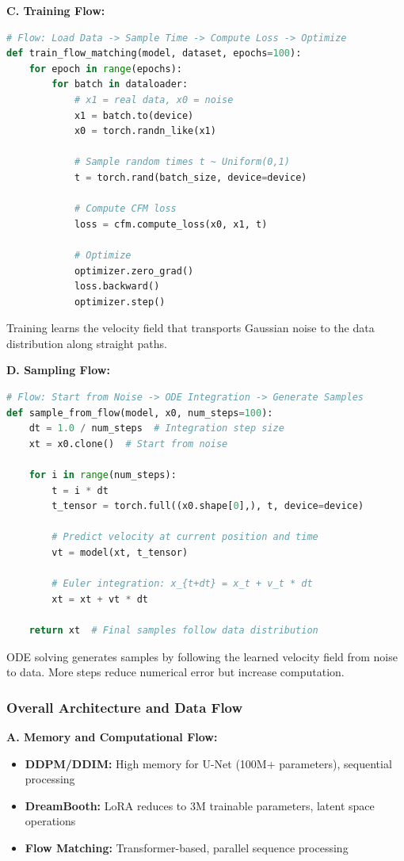 \documentclass[a4paper,12pt]{article}
\begin{document}
\textbf{C. Training Flow:}
\begin{lstlisting}[language=Python]
# Flow: Load Data -> Sample Time -> Compute Loss -> Optimize
def train_flow_matching(model, dataset, epochs=100):
    for epoch in range(epochs):
        for batch in dataloader:
            # x1 = real data, x0 = noise
            x1 = batch.to(device)
            x0 = torch.randn_like(x1)
            
            # Sample random times t ~ Uniform(0,1)
            t = torch.rand(batch_size, device=device)
            
            # Compute CFM loss
            loss = cfm.compute_loss(x0, x1, t)
            
            # Optimize
            optimizer.zero_grad()
            loss.backward()
            optimizer.step()
\end{lstlisting}
Training learns the velocity field that transports Gaussian noise to the data distribution along straight paths.

\textbf{D. Sampling Flow:}
\begin{lstlisting}[language=Python]
# Flow: Start from Noise -> ODE Integration -> Generate Samples
def sample_from_flow(model, x0, num_steps=100):
    dt = 1.0 / num_steps  # Integration step size
    xt = x0.clone()  # Start from noise
    
    for i in range(num_steps):
        t = i * dt
        t_tensor = torch.full((x0.shape[0],), t, device=device)
        
        # Predict velocity at current position and time
        vt = model(xt, t_tensor)
        
        # Euler integration: x_{t+dt} = x_t + v_t * dt
        xt = xt + vt * dt
    
    return xt  # Final samples follow data distribution
\end{lstlisting}
ODE solving generates samples by following the learned velocity field from noise to data. More steps reduce numerical error but increase computation.

\subsubsection{Overall Architecture and Data Flow}

\textbf{A. Memory and Computational Flow:}
\begin{itemize}
    \item \textbf{DDPM/DDIM:} High memory for U-Net (100M+ parameters), sequential processing
    \item \textbf{DreamBooth:} LoRA reduces to 3M trainable parameters, latent space operations
    \item \textbf{Flow Matching:} Transformer-based, parallel sequence processing
\end{itemize}
\end{document}
